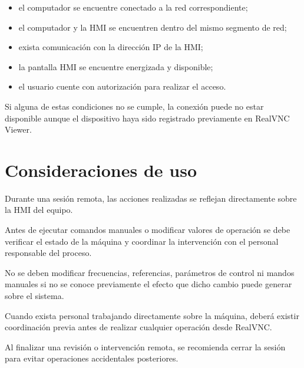 \documentclass[11pt,a4paper]{article}
\begin{document}
\begin{itemize}

    \item el computador se encuentre conectado a la red correspondiente;

    \item el computador y la HMI se encuentren dentro del mismo segmento
    de red;

    \item exista comunicación con la dirección IP de la HMI;

    \item la pantalla HMI se encuentre energizada y disponible;

    \item el usuario cuente con autorización para realizar el acceso.

\end{itemize}

Si alguna de estas condiciones no se cumple, la conexión puede no estar
disponible aunque el dispositivo haya sido registrado previamente en
RealVNC Viewer.



\section{Consideraciones de uso}

Durante una sesión remota, las acciones realizadas se reflejan
directamente sobre la HMI del equipo.

Antes de ejecutar comandos manuales o modificar valores de operación se
debe verificar el estado de la máquina y coordinar la intervención con el
personal responsable del proceso.

No se deben modificar frecuencias, referencias, parámetros de control ni
mandos manuales si no se conoce previamente el efecto que dicho cambio
puede generar sobre el sistema.

Cuando exista personal trabajando directamente sobre la máquina, deberá
existir coordinación previa antes de realizar cualquier operación desde
RealVNC.

Al finalizar una revisión o intervención remota, se recomienda cerrar la
sesión para evitar operaciones accidentales posteriores.

\end{document}
